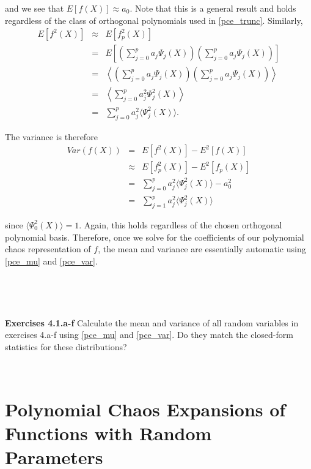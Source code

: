 \documentclass[11pt]{article}
\numberwithin{equation}{section}
\begin{document}
and we see that $E[ f(X) ] \approx a_0$. Note that this is a general result and holds regardless of the class of orthogonal polynomials used in \eqref{pce_trunc}. Similarly,
\begin{eqnarray*}
E [ f^2(X) ] & \approx & E [ f_p^2(X) ] \\
& = & E \left[ \left( \sum_{j = 0}^p a_j \Psi_j(X) \right) \left( \sum_{j = 0}^p a_j \Psi_j(X) \right) \right] \\
& = & \left\langle \left( \sum_{j = 0}^p a_j \Psi_j(X) \right) \left( \sum_{j = 0}^p a_j \Psi_j(X) \right) \right\rangle \\
& = & \left\langle \sum_{j = 0}^p a_j^2 \Psi_j^2(X) \right\rangle \\
& = & \sum_{j = 0}^p a_j^2  \langle \Psi_j^2(X) \rangle.
\end{eqnarray*}

The variance is therefore
\begin{eqnarray}
Var(f(X)) & = & E \left[ f^2(X) \right] - E^2 \left[ f(X) \right] \nonumber \\
& \approx & E \left[ f_p^2(X) \right] - E^2 \left[ f_p(X) \right] \nonumber \\
& = & \sum_{j = 0}^p a_j^2  \langle \Psi_j^2(X) \rangle - a_0^2  \nonumber \\
& = & \sum_{j = 1}^p a_j^2  \langle \Psi_j^2(X) \rangle \label{pce_var}
\end{eqnarray}

since $\langle \Psi_0^2(X) \rangle = 1$. Again, this holds regardless of the chosen orthogonal polynomial basis. Therefore, once we solve for the coefficients of our polynomial chaos representation of $f$, the mean and variance are essentially automatic using \eqref{pce_mu} and \eqref{pce_var}.





\

\

\textbf{Exercises 4.1.a-f} Calculate the mean and variance of all random variables in exercises 4.a-f using \eqref{pce_mu} and \eqref{pce_var}. Do they match the closed-form statistics for these distributions?

\











\section{Polynomial Chaos Expansions of Functions with Random Parameters}
\end{document}
